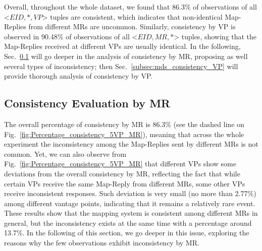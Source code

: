 Overall, throughout the whole dataset, we found that 86.3\% of observations of all <$EID, *, VP$> tuples are consistent, which indicates that non-identical Map-Replies from different MRs are uncommon. Similarly, consistency by VP is observed in 90.48\% of observations of all <$EID, MR, * $> tuples, showing that the Map-Replies received at different VPs are usually identical. In the following, Sec.~\ref{subsec:mds_consistency_MR} will go deeper in the analysis of consistency by MR, proposing as well several types of inconsistency; then Sec.~\ref{subsec:mds_consistency_VP} will provide thorough analysis of consistency by VP.


\subsection{Consistency Evaluation by MR}
\label{subsec:mds_consistency_MR}

The overall percentage of consistency by MR is 86.3\% (see the dashed line on Fig.~\ref{fig:Percentage_consistency_5VP_MR}), meaning that across the whole experiment the inconsistency among the Map-Replies sent by different MRs is not common. Yet, we can also observe from Fig.~\ref{fig:Percentage_consistency_5VP_MR} that different VPs show some deviations from the overall consistency by MR, reflecting the fact that while certain VPs receive the same Map-Reply from different MRs, some other VPs receive inconsistent responses. Such deviation is very small (no more than 2.77\%) among different vantage points, indicating that it remains a relatively rare event. These results show that the mapping system is consistent among different MRs in general, but the inconsistency exists at the same time with a percentage around 13.7\%.  In the following of this section, we go deeper in this issue, exploring the reasons why the few observations exhibit
inconsistency by MR.

